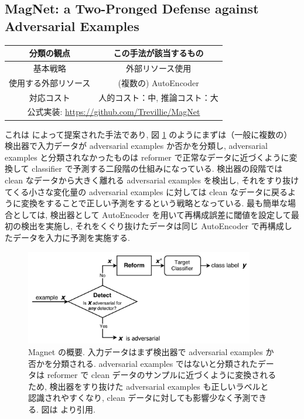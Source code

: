 \subsection{MagNet: a Two-Pronged Defense against Adversarial Examples}
\label{subsec:magnet}
%
\begin{table}[htbp]
\begin{center}
\begin{tabular}{|c|c|}
\hline
分類の観点 & この手法が該当するもの \\
\hline
基本戦略 & 外部リソース使用 \\
使用する外部リソース & (複数の) AutoEncoder \\
対応コスト & 人的コスト：中, 推論コスト：大 \\
\hline
\multicolumn{2}{|c|}{公式実装: \href{https://github.com/Trevillie/MagNet}{https://github.com/Trevillie/MagNet}} \\
\hline
\end{tabular}
\label{tb:magnet-summary}
\end{center}
\end{table}
%

これは \cite{meng2017magnet} によって提案された手法であり, 図 \ref{fig:magnet-summary} のようにまずは（一般に複数の）検出器で入力データが adversarial examples か否かを分類し, adversarial examples と分類されなかったものは reformer で正常なデータに近づくように変換して classifier で予測する二段階の仕組みになっている.
検出器の段階では clean なデータから大きく離れる adversarial examples を検出し, それをすり抜けてくる小さな変化量の adversarial examples に対しては clean なデータに戻るように変換をすることで正しい予測をするという戦略となっている.
最も簡単な場合としては, 検出器として AutoEncoder を用いて再構成誤差に閾値を設定して最初の検出を実施し, それをくぐり抜けたデータは同じ AutoEncoder で再構成したデータを入力に予測を実施する.
%
\begin{figure}[htbp]
\begin{center}
\includegraphics[width=10.0cm]{figures/magnet-summary.pdf}
\end{center}
\caption{
Magnet の概要.
入力データはまず検出器で adversarial examples か否かを分類される.
adversarial examples ではないと分類されたデータは reformer で clean データのサンプルに近づくように変換されるため, 検出器をすり抜けた adversarial examples も正しいラベルと認識されやすくなり, clean データに対しても影響少なく予測できる.
図は \cite{meng2017magnet} より引用.
}
\label{fig:magnet-summary}
\end{figure}


